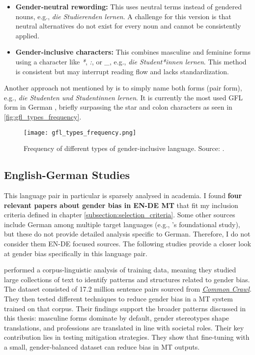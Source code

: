 \begin{itemize}
    \item \textbf{Gender-neutral rewording:}  
    This uses neutral terms instead of gendered nouns, e.g., \textit{die Studierenden lernen}. A challenge for this version is that neutral alternatives do not exist for every noun and cannot be consistently applied.

    \item \textbf{Gender-inclusive characters:}  
    This combines masculine and feminine forms using a character like \textit{*}, \textit{:}, or \textit{\_}, e.g., \textit{die Student*innen lernen}. This method is consistent but may interrupt reading flow and lacks standardization.
\end{itemize}

\noindent Another approach not mentioned by \citeauthor{lardelliBuildingBridgesDataset2024} is to simply name both forms (pair form), e.g., \textit{die Studenten und Studentinnen lernen}. It is currently the most used GFL form in German \citep{waldendorfWordsChangeIncrease2024}, briefly surpassing the star and colon characters as seen in \autoref{fig:gfl_types_frequency}.

\begin{figure}
	\centering
		\texttt{[image: gfl\_types\_frequency.png]}
	\caption{Frequency of different types of gender-inclusive language. Source: \citet{waldendorfWordsChangeIncrease2024}.}
	\label{fig:gfl_types_frequency}
\end{figure}


\subsection{English-German Studies}
This language pair in particular is sparsely analysed in academia. I found \textbf{four relevant papers about gender bias in EN-DE MT} that fit my inclusion criteria defined in chapter \ref{subsection:selection_criteria}. Some other sources include German among multiple target languages (e.g., \citeauthor{stanovskyEvaluatingGenderBias2019}'s foundational study), but these do not provide detailed analysis specific to German. Therefore, I do not consider them EN-DE focused sources. The following studies provide a closer look at gender bias specifically in this language pair.

\textbf{\cite{ullmannGenderBiasMachine2022}} performed a corpus-linguistic analysis of training data, meaning they studied large collections of text to identify patterns and structures related to gender bias. The dataset consisted of 17.2 million sentence pairs sourced from \href{https://commoncrawl.org/}{\textit{Common Crawl}}. They then tested different techniques to reduce gender bias in a MT system trained on that corpus. Their findings support the broader patterns discussed in this thesis: masculine forms dominate by default, gender stereotypes shape translations, and professions are translated in line with societal roles. Their key contribution lies in testing mitigation strategies. They show that fine-tuning with a small, gender-balanced dataset can reduce bias in MT outputs. 

